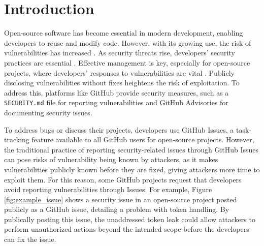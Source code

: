 \section{Introduction}
\label{1_introduction}






Open-source software has become essential in modern development, enabling developers to reuse and modify code. However, with its growing use, the risk of vulnerabilities has increased \cite{Alfadel:EMSE2023}. As security threats rise, developers' security practices are essential \cite{Zahan:ICSE2023}. Effective management is key, especially for open-source projects, where developers' responses to vulnerabilities are vital \cite{Prana:EMSE2021}. Publicly disclosing vulnerabilities without fixes heightens the risk of exploitation. To address this, platforms like GitHub provide security measures, such as a \texttt{SECURITY.md} file \cite{GitHubSecurityPolicy:online} for reporting vulnerabilities and GitHub Advisories \cite{GitHubAdvisoryDatabase:online} for documenting security issues. 

To address bugs or discuss their projects, developers use GitHub Issues, a task-tracking feature available to all GitHub users for open-source projects. However, the traditional practice of reporting security-related issues through GitHub Issues can pose risks of vulnerability being known by attackers, as it makes vulnerabilities publicly known before they are fixed, giving attackers more time to exploit them. For this reason, some GitHub projects request that developers avoid reporting vulnerabilities through Issues. For example, Figure \ref{fig:example_issue} shows a security issue in an open-source project posted publicly as a GitHub issue, detailing a problem with token handling. By publically posting this issue, the unaddressed token leak could allow attackers to perform unauthorized actions beyond the intended scope before the developers can fix the issue.

